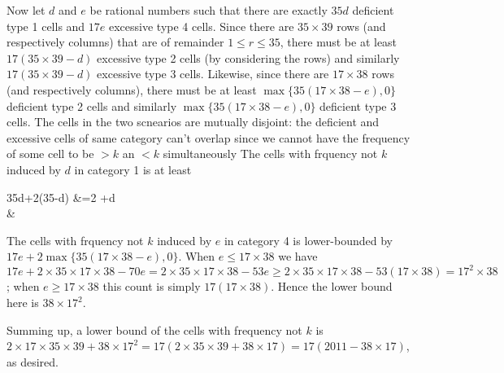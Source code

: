 \documentclass[11pt,a4paper]{article}
\begin{document}
\begin{enumerate}
	Now let $d$ and $e$ be rational numbers such that there are exactly $35d$ deficient type 1 cells and $17e$ excessive type 4 cells. Since there are $35\times 39$ rows (and respectively columns) that are of remainder $1\le r\le 35$, there must be at least $17(35\times 39-d)$ excessive type 2 cells (by considering the rows) and similarly $17(35\times 39-d)$ excessive type 3 cells. Likewise, since there are $17\times 38$ rows (and respectively columns), there must be at least $\max\{35(17\times 38-e), 0\}$ deficient type 2 cells and similarly $\max\{35(17\times 38-e), 0\}$ deficient type 3 cells. 
	The cells in the two scnearios are mutually disjoint: the deficient and excessive cells of same category can't overlap since we cannot have the frequency of some cell to be $>k$ an $<k$ simultaneously
	The cells with frquency not $k$ induced by $d$ in category 1 is at least 
	\begin{flalign*}
		35d+2(35-d)
		&=2 +d
		\\&
	\end{flalign*}
	The cells with frquency not $k$ induced by $e$ in category 4 is lower-bounded by $17e+2\max\{35(17\times 38-e), 0\}$. When $e\le 17\times 38$ we have $17e+2\times 35\times 17\times 38 - 70e = 2\times 35\times 17\times 38 - 53e \ge 2\times 35\times 17\times 38 - 53(17\times 38) = 17^2\times 38$; when $e\ge 17\times 38$ this count is simply $17(17\times 38)$. Hence the lower bound here is $38\times 17^2$. 
	
	Summing up, a lower bound of the cells with frequency not $k$ is $2\times 17\times 35\times 39 + 38\times 17^2 = 17(2\times 35\times 39 + 38\times 17)=17(2011-38\times 17)$, as desired. 
	
\end{enumerate}
\end{document}
